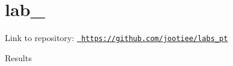 \chapter{lab\+\_}
\hypertarget{index}{}\label{index}
Link to repository\+: \href{https://github.com/jootiee/labs_pt}{\texttt{ https\+://github.\+com/jootiee/labs\+\_\+pt}}

Results  